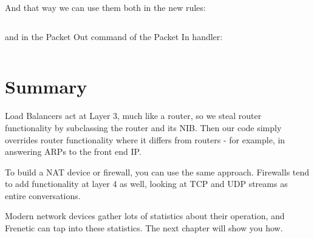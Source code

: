 And that way we can use them both in the new rules:

\inputminted[firstline=54,lastline=68]{python}{code/routing_variants/load_balancer_handler2.py} 

and in the Packet Out command of the Packet In handler:

\inputminted[firstline=87]{python}{code/routing_variants/load_balancer_handler2.py} 

\section{Summary}

Load Balancers act at Layer 3, much like a router, so we steal router functionality by 
subclassing the router and its NIB.  Then our code simply overrides router functionality
where it differs from routers - for example, in answering ARPs to the front end IP.  

To build a NAT device or firewall, you can use the same approach.  Firewalls tend to 
add functionality at layer 4 as well, looking at TCP and UDP streams as entire
conversations.  

Modern network devices gather lots of statistics about their operation, and Frenetic can
tap into these statistics.   The next chapter will show you how.  

